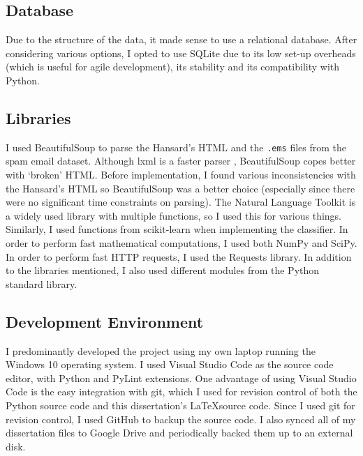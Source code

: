 \documentclass[12pt,a4paper,twoside,openright]{report}
\begin{document}
\subsection{Database} \label{prep-database}

Due to the structure of the data, it made sense to use a relational database. After considering various options, I opted to use SQLite due to its low set-up overheads (which is useful for agile development), its stability and its compatibility with Python.

\subsection{Libraries} \label{prep-tools-libs}

I used BeautifulSoup to parse the Hansard's HTML and the \texttt{.ems} files from the spam email dataset. Although lxml is a faster parser \cite{parsing}, BeautifulSoup copes better with `broken' HTML. Before implementation, I found various inconsistencies with the Hansard's HTML so BeautifulSoup was a better choice (especially since there were no significant time constraints on parsing). The Natural Language Toolkit is a widely used library with multiple functions, so I used this for various things. Similarly, I used functions from scikit-learn when implementing the classifier. In order to perform fast mathematical computations, I used both NumPy and SciPy. In order to perform fast HTTP requests, I used the Requests library. In addition to the libraries mentioned, I also used different modules from the Python standard library.

\subsection{Development Environment}

I predominantly developed the project using my own laptop running the Windows 10 operating system. I used Visual Studio Code as the source code editor, with Python and PyLint extensions. One advantage of using Visual Studio Code is the easy integration with git, which I used for revision control of both the Python source code and this dissertation's \LaTeX \space source code. Since I used git for revision control, I used GitHub to backup the source code. I also synced all of my dissertation files to Google Drive and periodically backed them up to an external disk.
\end{document}
